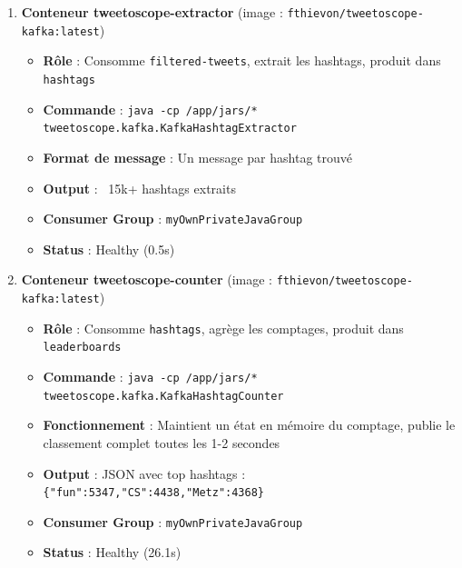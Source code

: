 \documentclass[10pt,a4paper]{article}
\begin{document}
\begin{enumerate}
    \item \textbf{Conteneur tweetoscope-extractor} (image : \texttt{fthievon/tweetoscope-kafka:latest})
    \begin{itemize}
        \item \textbf{Rôle} : Consomme \texttt{filtered-tweets}, extrait les hashtags, produit dans \texttt{hashtags}
        \item \textbf{Commande} : \texttt{java -cp /app/jars/* tweetoscope.kafka.KafkaHashtagExtractor}
        \item \textbf{Format de message} : Un message par hashtag trouvé
        \item \textbf{Output} : ~15k+ hashtags extraits
        \item \textbf{Consumer Group} : \texttt{myOwnPrivateJavaGroup}
        \item \textbf{Status} : Healthy (0.5s)
    \end{itemize}

    \item \textbf{Conteneur tweetoscope-counter} (image : \texttt{fthievon/tweetoscope-kafka:latest})
    \begin{itemize}
        \item \textbf{Rôle} : Consomme \texttt{hashtags}, agrège les comptages, produit dans \texttt{leaderboards}
        \item \textbf{Commande} : \texttt{java -cp /app/jars/* tweetoscope.kafka.KafkaHashtagCounter}
        \item \textbf{Fonctionnement} : Maintient un état en mémoire du comptage, publie le classement complet toutes les 1-2 secondes
        \item \textbf{Output} : JSON avec top hashtags : \texttt{\texttt{\{"fun":5347,"CS":4438,"Metz":4368\}}}
        \item \textbf{Consumer Group} : \texttt{myOwnPrivateJavaGroup}
        \item \textbf{Status} : Healthy (26.1s)
    \end{itemize}


\end{enumerate}
\end{document}
